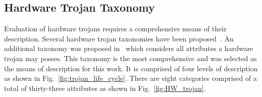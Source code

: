 \documentclass[conference]{IEEEtran}
\begin{document}
\subsection{Hardware Trojan Taxonomy} \label{sec:taxonomy}
Evaluation of hardware trojans requires a comprehensive means of their description.
Several hardware trojan taxonomies have been proposed~\cite{taxonomy1, taxonomy2, taxonomy3, taxonomy4}.
An additional taxonomy was proposed in~\cite{samerAttribute} which considers all attributes a hardware trojan may posses.
This taxonomy is the most comprehensive and was selected as the means of description for this work.
It is comprised of four levels of description as shown in Fig.~\ref{fig:trojan_life_cycle}.
There are eight categories comprised of a total of thirty-three attributes as shown in Fig.~\ref{fig:HW_trojan}.
\end{document}
